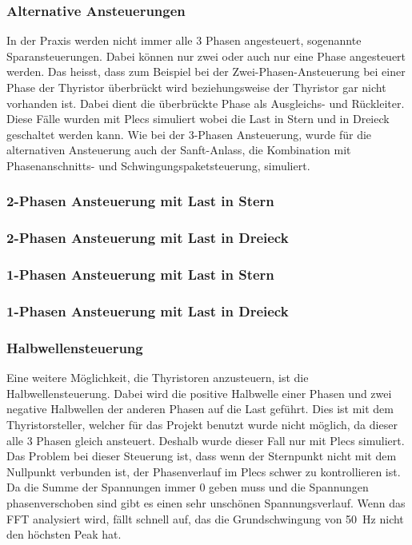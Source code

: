 \newpage

\subsubsection{Alternative Ansteuerungen}\label{Spar-Ansteuerung}
In der Praxis werden nicht immer alle 3 Phasen angesteuert, sogenannte Sparansteuerungen. Dabei können nur zwei oder auch nur eine Phase angesteuert werden. Das heisst, dass zum Beispiel bei der Zwei-Phasen-Ansteuerung bei einer Phase der Thyristor überbrückt wird beziehungsweise der Thyristor gar nicht vorhanden ist. Dabei dient die überbrückte Phase als Ausgleichs- und Rückleiter. Diese Fälle wurden mit Plecs simuliert wobei die Last in Stern und in Dreieck geschaltet werden kann. Wie bei der 3-Phasen Ansteuerung, wurde für die alternativen Ansteuerung auch der Sanft-Anlass, die Kombination mit Phasenanschnitts- und Schwingungspaketsteuerung, simuliert.

\subsubsection*{2-Phasen Ansteuerung mit Last in Stern}

 
\subsubsection*{2-Phasen Ansteuerung mit Last in Dreieck}


\subsubsection*{1-Phasen Ansteuerung mit Last in Stern}


\subsubsection*{1-Phasen Ansteuerung mit Last in Dreieck}


\subsubsection*{Halbwellensteuerung}
Eine weitere Möglichkeit, die Thyristoren anzusteuern, ist die Halbwellensteuerung. Dabei wird die positive Halbwelle einer Phasen und zwei negative Halbwellen der anderen Phasen auf die Last geführt. Dies ist mit dem Thyristorsteller, welcher für das Projekt benutzt wurde nicht möglich, da dieser alle 3 Phasen gleich ansteuert. Deshalb wurde dieser Fall nur mit Plecs simuliert.  Das Problem bei dieser Steuerung ist, dass wenn der Sternpunkt nicht mit dem Nullpunkt verbunden ist, der Phasenverlauf im Plecs schwer zu kontrollieren ist. Da die Summe der Spannungen immer 0 geben muss und die Spannungen phasenverschoben sind gibt es einen sehr unschönen Spannungsverlauf. Wenn das FFT analysiert wird, fällt schnell auf, das die Grundschwingung von \SI{50}{Hz} nicht den höchsten Peak hat.



